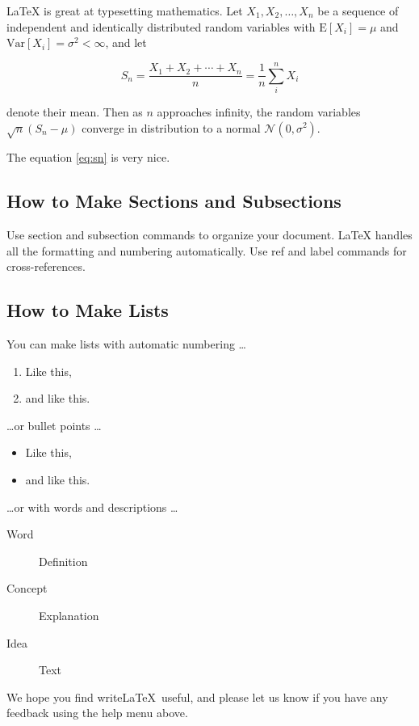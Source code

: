 \documentclass[a4paper]{article}
\begin{document}
\LaTeX{} is great at typesetting mathematics. Let $X_1, X_2, \ldots, X_n$ be a sequence of independent and identically distributed random variables with $\text{E}[X_i] = \mu$ and $\text{Var}[X_i] = \sigma^2 < \infty$, and let
      
\begin{equation}
	S_n = \frac{X_1 + X_2 + \cdots + X_n}{n}
	= \frac{1}{n}\sum_{i}^{n} X_i
	\label{eq:sn}
\end{equation}
      
denote their mean. Then as $n$ approaches infinity, the random variables $\sqrt{n}(S_n - \mu)$ converge in distribution to a normal $\mathcal{N}(0, \sigma^2)$.
      
The equation \ref{eq:sn} is very nice.
      
\subsection{How to Make Sections and Subsections}
      
Use section and subsection commands to organize your document. \LaTeX{} handles all the formatting and numbering automatically. Use ref and label commands for cross-references.
      
\subsection{How to Make Lists}
      
You can make lists with automatic numbering \dots
      
\begin{enumerate}
	\item Like this,
	\item and like this.
\end{enumerate}
\dots or bullet points \dots
\begin{itemize}
	\item Like this,
	\item and like this.
\end{itemize}
\dots or with words and descriptions \dots
\begin{description}
	\item[Word] Definition
	\item[Concept] Explanation
	\item[Idea] Text
\end{description}
      
We hope you find write\LaTeX\ useful, and please let us know if you have any feedback using the help menu above.
      
\end{document}
